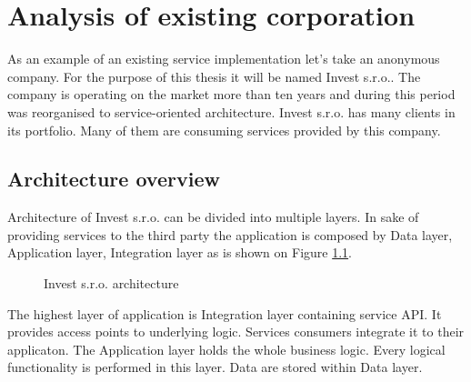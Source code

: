 \chapter{Analysis of existing corporation}

As an example of an existing service implementation let's take an anonymous company. For the purpose of this thesis it will be named Invest s.r.o.. The company is operating on the market more than ten years and during this period was reorganised to service-oriented architecture. Invest s.r.o. has many clients in its portfolio. Many of them are consuming services provided by this company.

\section{Architecture overview}
Architecture of Invest s.r.o. can be divided into multiple layers. In sake of providing services to the third party the application is composed by Data layer, Application layer, Integration layer as is shown on Figure \ref{fig:invest-architecture}.

\begin{figure}[htp] 
\caption{Invest s.r.o. architecture}
\label{fig:invest-architecture}
\end{figure} 

The highest layer of application is Integration layer containing service API. It provides access points to underlying logic. Services consumers integrate it to their applicaton. The Application layer holds the whole business logic. Every logical functionality is performed in this layer. Data are stored within Data layer.

